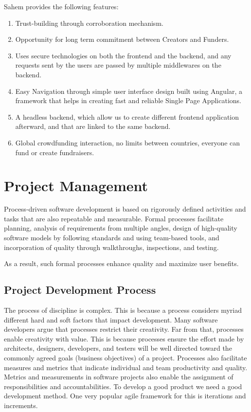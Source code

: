 Sahem provides the following features:
\begin{enumerate}
      \item
            Trust-building through corroboration mechanism.
      \item
            Opportunity for long term commitment between Creators and Funders.
      \item
            Uses secure technologies on both the frontend and the backend, and any requests sent by the users are passed by multiple middlewares on the backend.
      \item
            Easy Navigation through simple user interface design built using Angular, a framework that helps in creating fast and reliable Single Page Applications.
      \item
            A headless backend, which allow us to create different frontend application afterward, and that are linked to the same backend.
      \item
            Global crowdfunding interaction, no limits between countries, everyone can fund or create fundraisers.
\end{enumerate}
\section{ Project Management }
Process-driven software development is based on rigorously defined activities and tasks that are also repeatable and measurable. Formal processes facilitate planning, analysis of requirements from multiple angles, design of high-quality software models by following standards and using team-based tools, and incorporation of quality through walkthroughs, inspections, and testing.

As a result, such formal processes enhance quality and maximize user benefits.
\subsection{ Project Development Process }
The process of discipline is complex. This is because a process considers myriad different hard and soft factors that impact development. Many software developers argue that processes restrict their creativity. Far from that, processes enable creativity with value. This is because processes ensure the effort made by architects, designers, developers, and testers will be well directed toward the commonly agreed goals (business objectives) of a project. Processes also facilitate measures and metrics that indicate individual and team productivity and quality. Metrics and measurements in software projects also enable the assignment of responsibilities and accountabilities.
To develop a good product we need a good development method. One very popular agile framework for this is iterations and increments.\\

